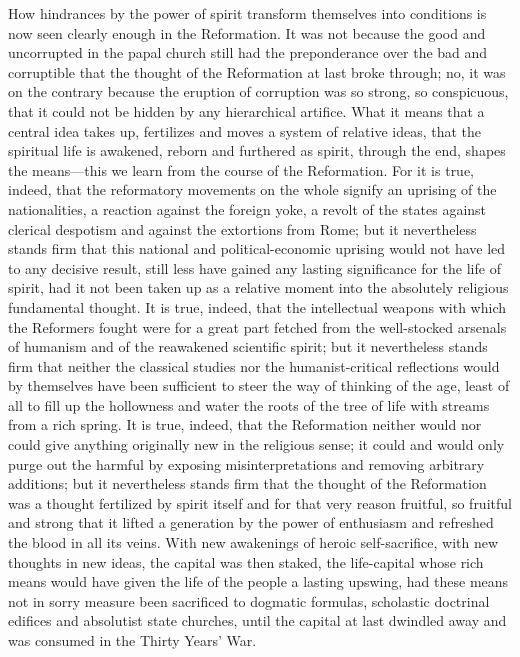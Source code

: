 \documentclass[12pt]{book}
\newcommand{\opage}[1]{\marginnote{\footnotesize\textit{[#1]}}}
\begin{document}
How hindrances by the power of spirit transform themselves into
conditions is now seen clearly enough in the Reformation. It was not
because the good and uncorrupted in the papal church still had the
preponderance over the bad and corruptible that the thought of the
Reformation at last broke through; no, it was on the contrary because the
eruption of corruption was so
\opage{31}\setcounter{footnote}{0}%
strong, so conspicuous, that it could not be hidden by any hierarchical
artifice. What it means that a central idea takes up, fertilizes and
moves a system of relative ideas, that the spiritual life is awakened,
reborn and furthered as spirit, through the end, shapes the means---this
we learn from the course of the Reformation. For it is true, indeed,
that the reformatory movements on the whole signify an uprising of the
nationalities, a reaction against the foreign yoke, a revolt of the
states against clerical despotism and against the extortions from Rome;
but it nevertheless stands firm that this national and
political-economic uprising would not have led to any decisive result,
still less have gained any lasting significance for the life of spirit,
had it not been taken up as a relative moment into the absolutely
religious fundamental thought. It is true, indeed, that the intellectual
weapons with which the Reformers fought were for a great part fetched
from the well-stocked arsenals of humanism and of the reawakened
scientific spirit; but it nevertheless stands firm that neither the
classical studies nor the humanist-critical reflections would by
themselves have been sufficient to steer the way of thinking of the age,
least of all to fill up the hollowness and water the roots of the tree
of life with streams from a rich spring. It is true, indeed, that the
Reformation neither would nor could give anything originally new in the
religious sense; it could and would only purge out the harmful by
exposing misinterpretations and removing arbitrary additions; but it
nevertheless stands firm that the thought of the Reformation was a
thought fertilized by spirit itself and for that very reason fruitful,
so fruitful and strong that it lifted a generation by the power of
enthusiasm and refreshed the blood in all its veins. With new
awakenings of heroic self-sacrifice, with new thoughts in new ideas, the
capital was then staked, the life-capital whose rich means would have
given the life of the people a lasting upswing, had these means not
\opage{32}\setcounter{footnote}{0}%
in sorry measure been sacrificed to dogmatic formulas, scholastic
doctrinal edifices and absolutist state churches, until the capital at
last dwindled away and was consumed in the Thirty Years' War.
\end{document}
